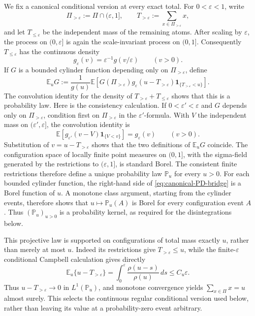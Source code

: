 \documentclass[11pt]{article}
\numberwithin{equation}{section}
\theoremstyle{definition}
\theoremstyle{remark}
\newcommand{\1}{\mathbf 1}
\begin{document}
We fix a canonical conditional version at every exact total.  For
\(0<\varepsilon<1\), write
\[
 \Pi_{>\varepsilon}:=\Pi\cap(\varepsilon,1],\qquad
 T_{>\varepsilon}:=\sum_{x\in\Pi_{>\varepsilon}}x,
\]
and let \(T_{\leq\varepsilon}\) be the independent mass of the remaining
atoms.  After scaling by \(\varepsilon\), the process on
\((0,\varepsilon]\) is again the scale-invariant process on \((0,1]\).
Consequently \(T_{\leq\varepsilon}\) has the continuous density
\[
                         g_\varepsilon(v)
          =\varepsilon^{-1}g(v/\varepsilon)\qquad(v>0).
\]
If \(G\) is a bounded cylinder function depending only on
\(\Pi_{>\varepsilon}\), define
\begin{equation}
 \mathbb E_uG
 :=\frac1{g(u)}\mathbb E\!\left[
   G(\Pi_{>\varepsilon})
   g_\varepsilon(u-T_{>\varepsilon})
   \mathbf1_{\{T_{>\varepsilon}<u\}}\right].
 \label{eq:canonical-PD-bridge}
\end{equation}
The convolution identity for the density of
\(T_{>\varepsilon}+T_{\leq\varepsilon}\) shows that this is a probability
law.  Here is the consistency calculation.  If
\(0<\varepsilon'<\varepsilon\) and \(G\) depends only on
\(\Pi_{>\varepsilon}\), condition first on \(\Pi_{>\varepsilon}\) in
the \(\varepsilon'\)-formula.  With \(V\) the independent mass on
\((\varepsilon',\varepsilon]\), the convolution identity is
\begin{equation}
 \mathbb E\!\left[g_{\varepsilon'}(v-V)
                   \1_{\{V<v\}}\right]=g_\varepsilon(v)
 \qquad(v>0).
 \label{eq:PD-bridge-consistency-convolution}
\end{equation}
Substitution of \(v=u-T_{>\varepsilon}\) shows that the two definitions
of \(\mathbb E_uG\) coincide.  The configuration space of locally finite
point measures on \((0,1]\), with the sigma-field generated by the
restrictions to \((\varepsilon,1]\), is standard Borel.  The consistent
finite restrictions therefore define a unique probability law
\(\mathbb P_u\) for every \(u>0\).
For each bounded cylinder function, the right-hand side of
\eqref{eq:canonical-PD-bridge} is a Borel function of \(u\).  A monotone
class argument, starting from the cylinder events, therefore shows that
\(u\mapsto\mathbb P_u(A)\) is Borel for every configuration event \(A\).
Thus \((\mathbb P_u)_{u>0}\) is a probability kernel, as required for the
disintegrations below.

This projective law is supported on configurations of total mass exactly
\(u\), rather than merely at most \(u\).  Indeed its restrictions give
\(T_{>\varepsilon}\leq u\), while the finite-\(\varepsilon\)
conditional Campbell calculation gives directly
\begin{equation}
 \mathbb E_u\{u-T_{>\varepsilon}\}
 =\int_0^\varepsilon\frac{\rho(u-s)}{\rho(u)}\,ds
 \leq C_u\varepsilon.
 \label{eq:PD-small-mass-bound}
\end{equation}
Thus \(u-T_{>\varepsilon}\to0\) in \(L^1(\mathbb P_u)\), and monotone
convergence yields \(\sum_{x\in\Pi}x=u\) almost surely.  This selects the
continuous regular conditional version used below, rather than leaving
its value at a probability-zero event arbitrary.
\end{document}

